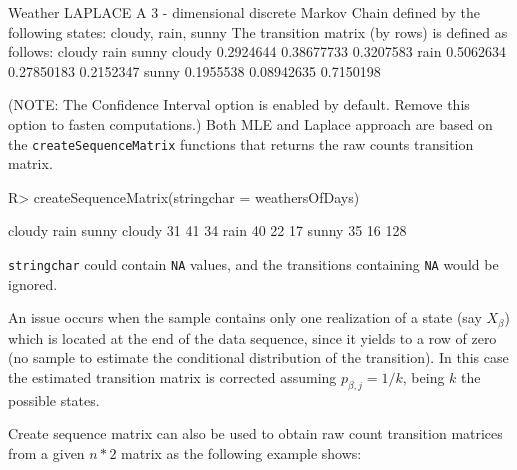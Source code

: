 \documentclass[
  nojss]{jss}
\begin{document}
\begin{CodeChunk}


\begin{CodeOutput}
Weather LAPLACE 
 A  3 - dimensional discrete Markov Chain defined by the following states: 
 cloudy, rain, sunny 
 The transition matrix  (by rows)  is defined as follows: 
          cloudy       rain     sunny
cloudy 0.2924644 0.38677733 0.3207583
rain   0.5062634 0.27850183 0.2152347
sunny  0.1955538 0.08942635 0.7150198
\end{CodeOutput}
\end{CodeChunk}

(NOTE: The Confidence Interval option is enabled by default. Remove this option to fasten computations.) Both MLE and Laplace approach are based on the \texttt{createSequenceMatrix} functions that returns the raw counts transition matrix.

\begin{CodeChunk}

\begin{CodeInput}
R> createSequenceMatrix(stringchar = weathersOfDays)
\end{CodeInput}

\begin{CodeOutput}
       cloudy rain sunny
cloudy     31   41    34
rain       40   22    17
sunny      35   16   128
\end{CodeOutput}
\end{CodeChunk}

\texttt{stringchar} could contain \texttt{NA} values, and the transitions containing \texttt{NA} would be ignored.

An issue occurs when the sample contains only one realization of a state (say \(X_{\beta}\)) which is located at the end of the data sequence, since it yields to a row of zero (no sample to estimate the conditional distribution of the transition). In this case the estimated transition matrix is corrected assuming \(p_{\beta,j}=1/k\), being \(k\) the possible states.

Create sequence matrix can also be used to obtain raw count transition matrices from a given \(n*2\) matrix as the following example shows:
\end{document}
